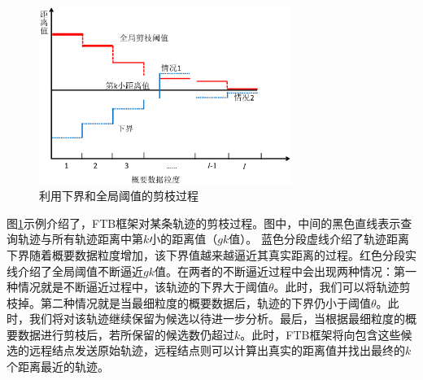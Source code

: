 \begin{figure}
	\centering
	\includegraphics[width=0.73\textwidth]{Fig/chapter3/FLB}
	\caption{利用下界和全局阈值的剪枝过程}
	\label{fig-chapter3-FLB}
\end{figure}

图\ref{fig-chapter3-FLB}示例介绍了，FTB框架对某条轨迹的剪枝过程。图中，中间的黑色直线表示查询轨迹与所有轨迹距离中第$k$小的距离值（$gk$值）。
蓝色分段虚线介绍了轨迹距离下界随着概要数据粒度增加，该下界值越来越逼近其真实距离的过程。红色分段实线介绍了全局阈值不断逼近$gk$值。在两者的不断逼近过程中会出现两种情况：第一种情况就是不断逼近过程中，该轨迹的下界大于阈值$\theta$。此时，我们可以将轨迹剪枝掉。第二种情况就是当最细粒度的概要数据后，轨迹的下界仍小于阈值$\theta$。此时，我们将对该轨迹继续保留为候选以待进一步分析。最后，当根据最细粒度的概要数据进行剪枝后，若所保留的候选数仍超过$k$。此时，FTB框架将向包含这些候选的远程结点发送原始轨迹，远程结点则可以计算出真实的距离值并找出最终的$k$个距离最近的轨迹。

